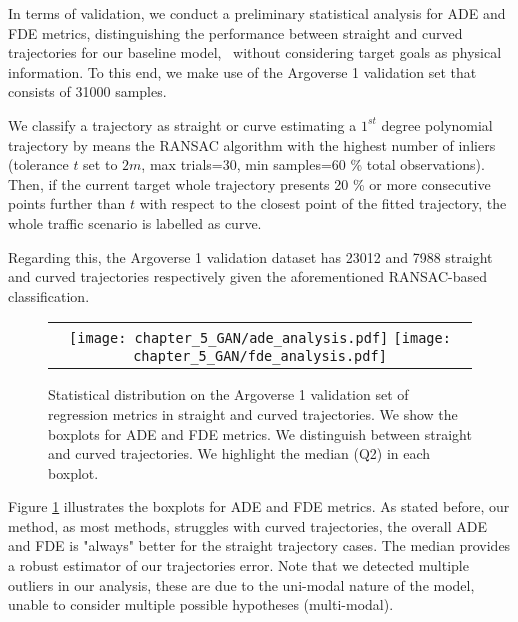 In terms of validation, we conduct a preliminary statistical analysis for \ac{ADE} and \ac{FDE} metrics, distinguishing the performance between straight and curved trajectories for our baseline model, \ie \ without considering target goals as physical information. To this end, we make use of the Argoverse 1 validation set that consists of 31000 samples.

We classify a trajectory as straight or curve estimating a $1^{st}$ degree polynomial trajectory by means the \ac{RANSAC} algorithm with the highest number of inliers (tolerance $t$ set to $2m$, max trials=$30$, min samples=$60$ \% total observations). Then, if the current target whole trajectory presents 20 \% or more consecutive points further than $t$ with respect to the closest point of the fitted trajectory, the whole traffic scenario is labelled as curve. 

Regarding this, the Argoverse 1 validation dataset has 23012 and 7988 straight and curved trajectories respectively given the aforementioned \ac{RANSAC}-based classification.

\begin{figure}[!ht]
	\centering
	\setlength{\tabcolsep}{2.0pt}
	\begin{tabular}{c}
		\texttt{[image: chapter\_5\_GAN/ade\_analysis.pdf]} %
		\texttt{[image: chapter\_5\_GAN/fde\_analysis.pdf]}\tabularnewline
	\end{tabular}
	\caption[Statistical distribution on the Argoverse 1 validation set of regression metrics in straight and curved trajectories]{Statistical distribution on the Argoverse 1 validation set of regression metrics in straight and curved trajectories. We show the boxplots for \ac{ADE} and \ac{FDE} metrics. We distinguish between straight and curved trajectories. We highlight the median (Q2) in each boxplot.}
	\label{fig:chapter_5_GAN/boxplots}
\end{figure}

Figure \ref{fig:chapter_5_GAN/boxplots} illustrates the boxplots for \ac{ADE} and \ac{FDE} metrics. As stated before, our method, as most methods, struggles with curved trajectories, the overall \ac{ADE} and \ac{FDE} is "always" better for the straight trajectory cases. The median provides a robust estimator of our trajectories error. Note that we detected multiple outliers in our analysis, these are due to the uni-modal nature of the model, unable to consider multiple possible hypotheses (multi-modal). 

